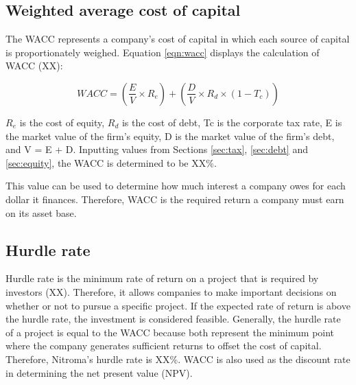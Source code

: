 \subsection{Weighted average cost of capital}
\label{sec:wacc}
The WACC represents a company’s cost of capital in which each source of capital is proportionately weighed. Equation \ref{eqn:wacc} displays the calculation of WACC (XX):

\begin{equation}
\label{eqn:wacc}
    WACC=\left(\frac{E}{V}\times R_{e}\right)+\left(\frac{D}{V}\times R_{d}\times (1-T_{c})\right)
\end{equation}

$R_{e}$ is the cost of equity, $R_{d}$ is the cost of debt, Tc is the corporate tax rate, E is the market value of the firm’s equity, D is the market value of the firm’s debt, and V = E + D. Inputting values from Sections \ref{sec:tax}, \ref{sec:debt} and \ref{sec:equity}, the WACC is determined to be XX\%. 

This value can be used to determine how much interest a company owes for each dollar it finances. Therefore, WACC is the required return a company must earn on its asset base. 

\subsection{Hurdle rate}
Hurdle rate is the minimum rate of return on a project that is required by investors (XX). Therefore, it allows companies to make important decisions on whether or not to pursue a specific project. If the expected rate of return is above the hurdle rate, the investment is considered feasible. Generally, the hurdle rate of a project is equal to the WACC because both represent the minimum point where the company generates sufficient returns to offset the cost of capital. Therefore, Nitroma's hurdle rate is XX\%. WACC is also used as the discount rate in determining the net present value (NPV).